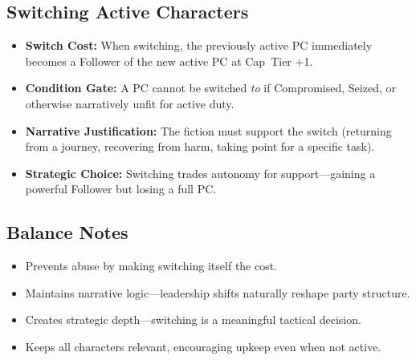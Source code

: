 \subsection*{Switching Active Characters}
\label{sec:switching-active-characters}
\begin{itemize}
  \item \textbf{Switch Cost:} When switching, the previously active PC immediately becomes a Follower of the new active PC at Cap~Tier +1.  
  \item \textbf{Condition Gate:} A PC cannot be switched \emph{to} if Compromised, Seized, or otherwise narratively unfit for active duty.  
  \item \textbf{Narrative Justification:} The fiction must support the switch (returning from a journey, recovering from harm, taking point for a specific task).  
  \item \textbf{Strategic Choice:} Switching trades autonomy for support—gaining a powerful Follower but losing a full PC.  
\end{itemize}

\subsection*{Balance Notes}
\begin{itemize}
  \item Prevents abuse by making switching itself the cost.  
  \item Maintains narrative logic—leadership shifts naturally reshape party structure.  
  \item Creates strategic depth—switching is a meaningful tactical decision.  
  \item Keeps all characters relevant, encouraging upkeep even when not active.  
\end{itemize}